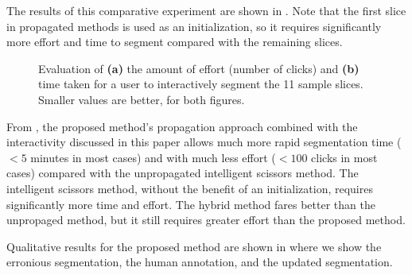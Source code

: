 \documentclass[]{spie}  %
\begin{document}
The results of this comparative experiment are shown in .
Note that the first slice in propagated methods is used as an
initialization, so it requires significantly more effort and time to
segment compared with the remaining slices.
\begin{figure}[htbp]
\centering
{}
\hspace{0.1em}
\caption{Evaluation of \textbf{(a)} the amount of effort (number of
  clicks) and \textbf{(b)} time taken for a user to interactively
  segment the 11 sample slices.  Smaller values are better, for both
  figures.} \label{fig:ex}
\end{figure}
From , the proposed method's propagation approach combined
with the interactivity discussed in this paper allows much more rapid
segmentation time ($< 5$ minutes in most cases) and with much less
effort ($< 100$ clicks in most cases) compared with the unpropagated
intelligent scissors method.  The intelligent scissors method, without
the benefit of an initialization, requires significantly more time and
effort.  The hybrid method fares better than the unpropaged method,
but it still requires greater effort than the proposed method.

Qualitative results for the proposed method are shown in 
where we show the erronious segmentation, the human annotation, and
the updated segmentation.
\end{document}
